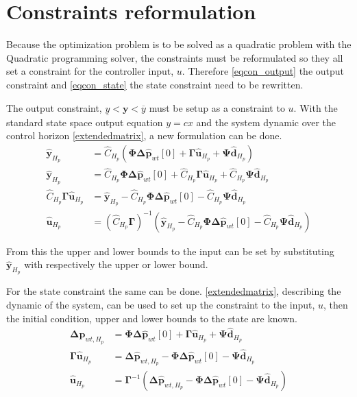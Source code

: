 
\section{Constraints reformulation}
\label{constraints_reformulation}

Because the optimization problem is to be solved as a quadratic problem with the Quadratic programming solver, the constraints must be reformulated so they all set a constraint for the controller input, $u$. Therefore \eqref{eqcon_output} the output constraint and \eqref{eqcon_state} the state constraint need to be rewritten. 

The output constraint, $\underline{y} < \bm{y} < \overline{y}$ must be setup as a constraint to $u$. With the standard state space output equation $y =c x$ and the system dynamic over the control horizon \eqref{extendedmatrix}, a new formulation can be done.
%
\begin{align}
	\bm{\hat y}_{H_p} &= \hat C_{H_p} (\bm{\Phi} \bm{\Delta \hat{p}}_{wt}[0] + \bm{\Gamma} \bm{\hat{u}}_{H_p} + \bm{\Psi} \bm{\hat{d}}_{H_p}) \nonumber \\
% 
	\bm{\hat y}_{H_p} &= \hat C_{H_p}\bm{\Phi} \bm{\Delta \hat{p}}_{wt}[0] + \hat C_{H_p}\bm{\Gamma} \bm{\hat{u}}_{H_p} + \hat C_{H_p}\bm{\Psi} \bm{\hat{d}}_{H_p} \nonumber \\
%
	\hat C_{H_p}\bm{\Gamma} \bm{\hat{u}}_{H_p} &= \bm{\hat y}_{H_p} - \hat C_{H_p}\bm{\Phi} \bm{\Delta \hat{p}}_{wt}[0] - \hat C_{H_p}\bm{\Psi} \bm{\hat{d}}_{H_p} \nonumber \\
%
	\bm{\hat{u}}_{H_p} &= (\hat C_{H_p}\bm{\Gamma})^{-1} (\bm{\hat y}_{H_p} - \hat C_{H_p}\bm{\Phi} \bm{\Delta \hat{p}}_{wt}[0] - \hat C_{H_p}\bm{\Psi} \bm{\hat{d}}_{H_p}) \label{eqnewcon_out}
\end{align}

From this the upper and lower bounds to the input can be set by substituting $\bm{\hat y}_{H_p}$ with respectively the upper or lower bound.

For the state constraint the same can be done. \eqref{extendedmatrix}, describing the dynamic of the system, can be used to set up the constraint to the input, $u$, then the initial condition, upper and lower bounds to the state are known. 
%
\begin{align}
	\bm{\Delta \hat{p}}_{wt,H_p} &= \bm{\Phi} \bm{\Delta \hat{p}}_{wt}[0] + \bm{\Gamma} \bm{\hat{u}}_{H_p} + \bm{\Psi} \bm{\hat{d}}_{H_p} \nonumber \\
%
	\bm{\Gamma} \bm{\hat{u}}_{H_p} &= \bm{\Delta \hat{p}}_{wt,H_p} - \bm{\Phi} \bm{\Delta \hat{p}}_{wt}[0] - \bm{\Psi} \bm{\hat{d}}_{H_p} \nonumber \\
%
	\bm{\hat{u}}_{H_p} &= \bm{\Gamma}^{-1} (\bm{\Delta \hat{p}}_{wt,H_p} - \bm{\Phi} \bm{\Delta \hat{p}}_{wt}[0] - \bm{\Psi} \bm{\hat{d}}_{H_p}) \label{eqnewcon_state}
\end{align}


